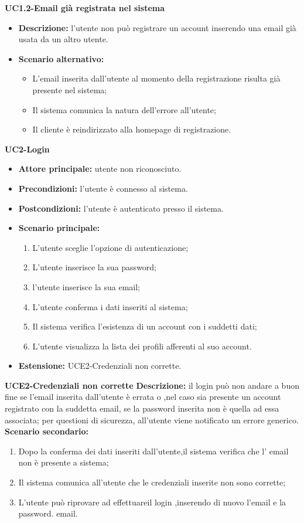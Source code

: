 \textbf{UC1.2-Email già registrata nel sistema}
\begin{itemize}
    \item \textbf{Descrizione: }l'utente non può registrare un account inserendo una email già usata da un altro utente.
    \item \textbf{Scenario alternativo:}
    \begin{itemize}
        \item L'email inserita dall'utente al momento della registrazione risulta già presente nel sistema;
        \item Il sistema comunica la natura dell'errore all'utente;
        \item Il cliente è reindirizzato alla homepage di registrazione.
    \end{itemize}
\end{itemize}
\break

\textbf{UC2-Login}
\begin{itemize}
\item \textbf{Attore principale:} utente non riconosciuto.
\item \textbf{Precondizioni:} l'utente è connesso al sistema.
\item \textbf{Postcondizioni:} l'utente è autenticato presso il sistema.
\item \textbf{Scenario principale:}
\begin{enumerate}
    \item L'utente sceglie l'opzione di autenticazione;
    \item L'utente inserisce la sua password;
    \item l'utente inserisce la sua email;
    \item L'utente conferma i dati inseriti al sistema;
    \item Il sistema verifica l'esistenza di un account con i suddetti dati;
    \item L'utente visualizza la lista dei profili afferenti al suo account.
\end{enumerate}
    \item \textbf{Estensione: }UCE2-Credenziali non corrette.
\end{itemize}

\textbf{UCE2-Credenziali non corrette}
\textbf{Descrizione: }il login può non andare a buon fine se l'email inserita dall'utente è errata
o ,nel caso sia presente un account registrato con la suddetta email, se la password inserita non è quella
ad essa associata; per questioni di sicurezza, all'utente viene notificato un errore generico.
\textbf{Scenario secondario:}
\begin{enumerate}
    \item Dopo la conferma dei dati inseriti dall'utente,il sistema verifica 
    che l' email non è presente a sistema;
    \item Il sistema comunica all'utente che le credenziali inserite non sono corrette;
    \item L'utente può riprovare ad effettuareil login ,inserendo di nuovo l'email e la password.
    email.
\end{enumerate}

